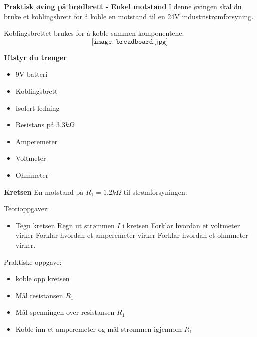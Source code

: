 

\large \textbf{Praktisk øving på brødbrett - Enkel motstand}
\normalsize 
\vskip 10pt 
I denne øvingen skal du bruke et koblingsbrett for å koble en motstand til en 24V industristrømforsyning.

\vskip 10pt 
Koblingsbrettet brukes for å koble sammen komponentene.
$$\texttt{[image: breadboard.jpg]}$$


\vskip 10pt 
\large \textbf{Utstyr du trenger}

\vskip 10pt 
\begin{itemize}[noitemsep]

\item 9V batteri
\item Koblingsbrett
\item Isolert ledning
\item Resistans på $3.3k\Omega$
\item Amperemeter
\item Voltmeter
\item Ohmmeter
\end{itemize}


\large \textbf{Kretsen}
\normalsize
\vskip 10pt 
En motstand på $R_{1}=1.2k\Omega$ til strømforsyningen. 

\vskip 10pt 
Teorioppgaver:
\begin{itemize}[noitemsep]
\item 
Tegn kretsen
Regn ut strømmen $I$ i kretsen
Forklar hvordan et voltmeter virker
Forklar hvordan et amperemeter virker
Forklar hvordan et ohmmeter virker.
\end{itemize}

Praktiske oppgave:
\begin{itemize}[noitemsep]
\item koble opp kretsen
\item Mål resistansen $R_{1}$
\item Mål spenningen over resistansen $R_{1}$
\item Koble inn et amperemeter og mål strømmen igjennom $R_{1}$
\end{itemize}



 




















